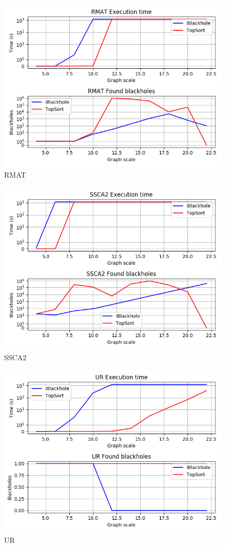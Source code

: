 \documentclass{svproc}
\begin{document}
%
%



\begin{figure}[p]
    \includegraphics[width=\linewidth]{rmat.png}
    \caption{RMAT}
    \label{fig:rmat}
\end{figure}
\begin{figure}[p]
    \includegraphics[width=\linewidth]{ssca2.png}
    \caption{SSCA2}
    \label{fig:ssca2}
\end{figure}
\begin{figure}[p]
    \includegraphics[width=\linewidth]{ur.png}
    \caption{UR}
    \label{fig:ur}
\end{figure}
\end{document}
